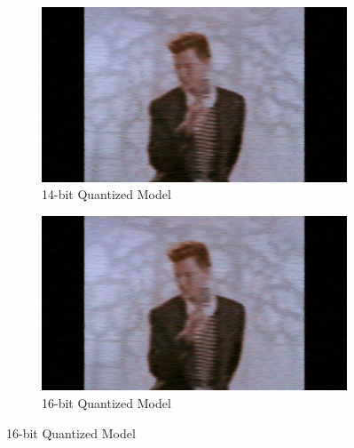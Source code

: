 \begin{figure}[H]
        \begin{subfigure}[b]{0.4\textwidth}
            \centering
            \includegraphics[width=\textwidth]{assets/quantization/frames/rickq14.png}
            \caption{14-bit Quantized Model}
            \label{fig:rickq14}
        \end{subfigure}
        \begin{subfigure}[b]{0.4\textwidth}
            \centering
            \includegraphics[width=\textwidth]{assets/quantization/frames/rickq16.png}
            \caption{16-bit Quantized Model}
            \label{fig:rickq16}
        \end{subfigure}
    

\end{figure}
